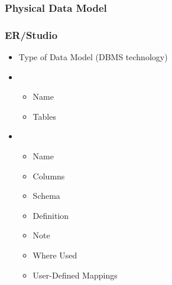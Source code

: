 \documentclass[12pt,a4paper]{report}
\begin{document}
\subsubsection{Physical Data Model}

\subsubsection{ER/Studio}

\begin{itemize}
	\item Type of Data Model (DBMS technology)
	\item {}
	\begin{itemize}
		\item Name
		\item Tables
	\end{itemize}
	\item {}
	\begin{itemize}
		\item Name
		\item Columns
		\item Schema
		\item Definition
		\item Note
		\item Where Used
		\item User-Defined Mappings

\end{itemize}
\end{itemize}
\end{document}
